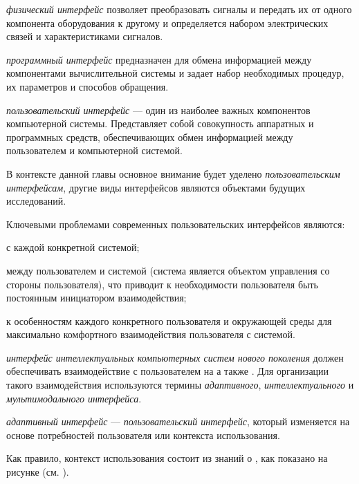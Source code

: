 \textit{физический интерфейс} позволяет преобразовать сигналы и передать их от одного компонента оборудования к другому и определяется набором электрических связей и характеристиками сигналов.

\textit{программный интерфейс} предназначен для обмена информацией между компонентами вычислительной системы и задает набор необходимых процедур, их параметров и способов обращения.

\textit{пользовательский интерфейс} --- один из наиболее важных компонентов компьютерной системы. Представляет собой совокупность аппаратных и программных средств, обеспечивающих обмен информацией между пользователем и компьютерной системой.

В контексте данной главы основное внимание будет уделено \textit{пользовательским интерфейсам}, другие виды интерфейсов являются объектами будущих исследований.

Ключевыми проблемами современных пользовательских интерфейсов являются:
\begin{textitemize}
	\item {} с каждой конкретной системой;
	\item {} между пользователем и системой (система является объектом управления со стороны пользователя), что приводит к необходимости пользователя быть постоянным инициатором взаимодействия;
	\item {} к особенностям каждого конкретного пользователя и окружающей среды для максимально комфортного взаимодействия пользователя с системой.
\end{textitemize}

\textit{интерфейс интеллектуальных компьютерных систем нового поколения} должен обеспечивать взаимодействие с пользователем на  а также  . Для организации такого взаимодействия используются термины \textit{адаптивного}, \textit{интеллектуального} и \textit{мультимодального интерфейса}.

\textit{адаптивный интерфейс} --- \textit{пользовательский интерфейс}, который изменяется на основе потребностей пользователя или контекста использования.

Как правило, контекст использования состоит из знаний о , как показано на рисунке  (см. ).

